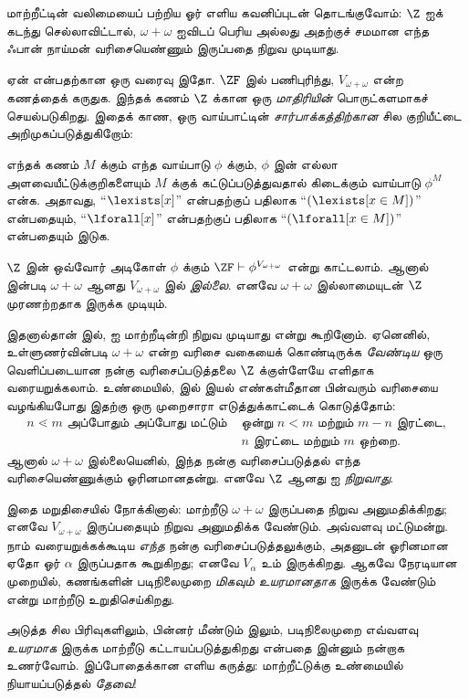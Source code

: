 \documentclass[../../../include/open-logic-section]{subfiles}
\begin{document}

மாற்றீட்டின் வலிமையைப் பற்றிய ஓர் எளிய கவனிப்புடன் தொடங்குவோம்:
$\Z$ ஐக் கடந்து செல்லாவிட்டால், $\omega + \omega$ ஐவிடப் பெரிய அல்லது
அதற்குச் சமமான எந்த ஃபான் நாய்மன் வரிசையெண்ணும் இருப்பதை நிறுவ முடியாது.

ஏன் என்பதற்கான ஒரு வரைவு இதோ. $\ZF$ இல் பணிபுரிந்து,
$V_{\omega+\omega}$ என்ற கணத்தைக் கருதுக. இந்தக் கணம் $\Z$ க்கான ஒரு
\emph{மாதிரியின்} பொருட்களமாகச் செயல்படுகிறது. இதைக் காண, ஒரு வாய்பாட்டின்
\emph{சார்பாக்கத்திற்கான} சில குறியீட்டை அறிமுகப்படுத்துகிறோம்:
\begin{defn}
	எந்தக் கணம் $M$ க்கும் எந்த வாய்பாடு $\phi$ க்கும், $\phi$ இன் எல்லா
	அளவையீட்டுக்குறிகளையும் $M$ க்குக் கட்டுப்படுத்துவதால் கிடைக்கும்
	வாய்பாடு $\phi^M$ என்க. அதாவது, ``$\lexists[x]$'' என்பதற்குப் பதிலாக
	``$(\lexists[x \in M])$'' என்பதையும், ``$\lforall[x]$'' என்பதற்குப்
	பதிலாக ``$(\lforall[x \in M])$'' என்பதையும் இடுக.
\end{defn}\noindent
$\Z$ இன் ஒவ்வோர் அடிகோள் $\phi$ க்கும் $\ZF \vdash
\phi^{V_{\omega+\omega}}$ என்று காட்டலாம். ஆனால்
 இன்படி $\omega+\omega$ ஆனது
$V_{\omega+\omega}$ இல் \emph{இல்லை}. எனவே $\omega+\omega$ இல்லாமையுடன்
$\Z$ முரணற்றதாக இருக்க முடியும்.

இதனால்தான்  இல்,
 ஐ மாற்றீடின்றி
நிறுவ முடியாது என்று கூறினோம். ஏனெனில், உள்ளுணர்வின்படி
$\omega+\omega$ என்ற வரிசை வகையைக் கொண்டிருக்க \emph{வேண்டிய} ஒரு
வெளிப்படையான நன்கு வரிசைப்படுத்தலை $\Z$ க்குள்ளேயே எளிதாக வரையறுக்கலாம்.
உண்மையில்,  இல் இயல் எண்கள்மீதான பின்வரும்
வரிசையை வழங்கியபோது இதற்கு ஒரு முறைசாரா எடுத்துக்காட்டைக் கொடுத்தோம்:
\begin{align*}
	n \lessdot m \text{ அப்போதும் அப்போது மட்டும் }&\text{ஒன்று }n < m\text{ மற்றும் }m-n\text{ இரட்டை,}\\
	& \text{$n$ இரட்டை மற்றும் $m$ ஒற்றை.}
\end{align*}
ஆனால் $\omega+\omega$ இல்லையெனில், இந்த நன்கு வரிசைப்படுத்தல் எந்த
வரிசையெண்ணுக்கும் ஓரினமானதன்று. எனவே $\Z$ ஆனது
 ஐ \emph{நிறுவாது}.

இதை மறுதிசையில் நோக்கினால்: மாற்றீடு $\omega+\omega$ இருப்பதை நிறுவ
அனுமதிக்கிறது; எனவே $V_{\omega+\omega}$ இருப்பதையும் நிறுவ அனுமதிக்க
வேண்டும். அவ்வளவு மட்டுமன்று. நாம் வரையறுக்கக்கூடிய \emph{எந்த} நன்கு
வரிசைப்படுத்தலுக்கும், அதனுடன் ஓரினமான ஏதோ ஓர் $\alpha$ இருப்பதாக
 கூறுகிறது; எனவே
$V_\alpha$ உம் இருக்கிறது. ஆகவே நேரடியான முறையில், கணங்களின் படிநிலைமுறை
\emph{மிகவும் உயரமானதாக} இருக்க வேண்டும் என்று மாற்றீடு உறுதிசெய்கிறது.

அடுத்த சில பிரிவுகளிலும், பின்னர் மீண்டும்
 இலும், படிநிலைமுறை எவ்வளவு
\emph{உயரமாக} இருக்க மாற்றீடு கட்டாயப்படுத்துகிறது என்பதை இன்னும் நன்றாக
உணர்வோம். இப்போதைக்கான எளிய கருத்து: மாற்றீட்டுக்கு உண்மையில்
நியாயப்படுத்தல் \emph{தேவை}!
\end{document}

